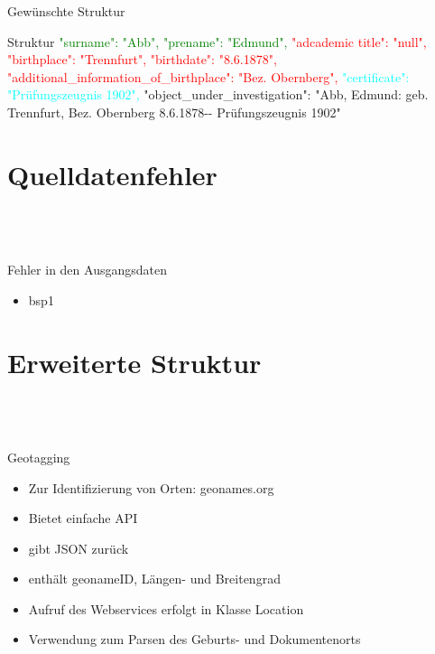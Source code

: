 \documentclass[12pt]{beamer}
\begin{document}
\begin{large}
\begin{frame}{Gewünschte Struktur}
 \begin{block}{Struktur}
  \small
  \textcolor{green}{"{}surname"{}: "{}Abb"{},}
  \newline
  \textcolor{green}{"{}prename"{}: "{}Edmund"{},}
  \newline 
  \textcolor{red}{"{}adcademic title"{}: "{}null"{},}
  \newline 
  \textcolor{red}{"{}birthplace"{}: "{}Trennfurt"{},}
  \newline
  \textcolor{red}{"{}birthdate"{}: "{}8.6.1878"{},}
  \newline
  \textcolor{red}{"{}additional\_information\_of\_birthplace"{}: "{}Bez. Obernberg"{},}
  \newline
  \textcolor{cyan}{"{}certificate"{}: "{}Prüfungszeugnis 1902"{},}
  \newline
  "{}object\_under\_investigation"{}: "{}Abb, Edmund: geb. Trennfurt, Bez. Obernberg 8.6.1878-{}- Prüfungszeugnis 1902"{}
 \end{block} 
\end{frame}


\section{Quelldatenfehler}
 \subsection*{~}
\begin{frame}{Fehler in den Ausgangsdaten}
 \begin{itemize}
  \item bsp1
 \end{itemize}
\end{frame}

\section{Erweiterte Struktur}
 \subsection*{~}

\begin{frame}{Geotagging}
\begin{itemize}
  \item Zur Identifizierung von Orten: geonames.org
  \item Bietet einfache API
  \item gibt JSON zurück
  \item enthält geonameID, Längen- und Breitengrad
  \item Aufruf des Webservices erfolgt in Klasse Location
  \item Verwendung zum Parsen des Geburts- und Dokumentenorts
 \end{itemize}
\end{frame}
 

\end{large}
\end{document}
